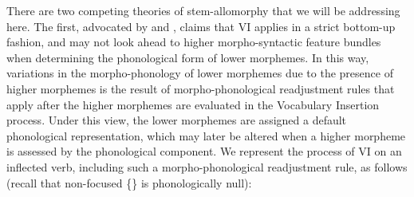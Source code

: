There are two competing theories of stem-allomorphy that we will be addressing here. The first, advocated by \citet{halle_marantz1993} and \citet{embick_marantz2006}, claims that VI applies in a strict bottom-up fashion, and may not look ahead to higher morpho-syntactic feature bundles when determining the phonological form of lower morphemes. In this way, variations in the morpho-phonology of lower morphemes due to the presence of higher morphemes is the result of morpho-phonological readjustment rules that apply after the higher morphemes are evaluated in the Vocabulary Insertion process. Under this view, the lower morphemes are assigned a default phonological representation, which may later be altered when a higher morpheme is assessed by the phonological component. We represent the process of VI on an inflected verb, including such a morpho-phonological readjustment rule, as follows (recall that non-focused \{\mbox{}\} is phonologically null):

